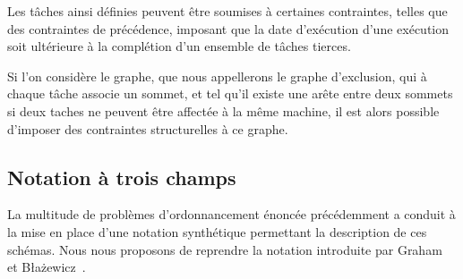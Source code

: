 Les tâches ainsi définies peuvent être soumises à certaines contraintes, telles que des contraintes
de précédence, imposant que la date d'exécution d'une exécution soit ultérieure à la complétion
d'un ensemble de tâches tierces.

Si l'on considère le graphe, que nous appellerons le graphe d'exclusion, qui à chaque tâche associe
un sommet, et tel qu'il existe une arête entre deux sommets si deux taches ne peuvent être affectée
à la même machine, il est alors possible d'imposer des contraintes structurelles à ce graphe. 

\subsection{Notation à trois champs}

La multitude de problèmes d'ordonnancement énoncée précédemment a conduit à la mise en place d'une
notation synthétique permettant la description de ces schémas. Nous nous proposons de reprendre la
notation introduite par Graham~\cite{graham} et B\l a\.zewicz~\cite{blazewicz}. 

